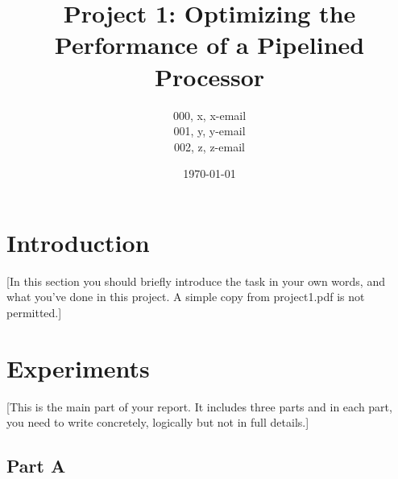\documentclass{article}
\title{\textbf{Project 1: Optimizing the Performance of a Pipelined Processor}} %
\author{000, x, x-email \\
        001, y, y-email \\
        002, z, z-email } %
\date{\today} %
\begin{document}
\maketitle %

\section{Introduction}

[In this section you should briefly introduce the task in your own words, and what you’ve done in this project. A simple copy from project1.pdf is not permitted.] \\


\section{Experiments}

[This is the main part of your report. It includes three parts and in each part, you need to write concretely, logically but not in full details.]


\subsection{Part A}
\end{document}
